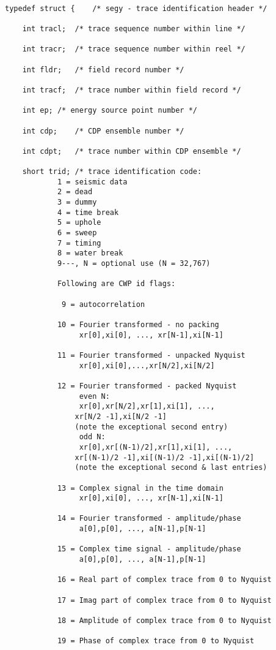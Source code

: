 
{ \small \begin{verbatim}

typedef struct {	/* segy - trace identification header */

	int tracl;	/* trace sequence number within line */

	int tracr;	/* trace sequence number within reel */

	int fldr;	/* field record number */

	int tracf;	/* trace number within field record */

	int ep;	/* energy source point number */

	int cdp;	/* CDP ensemble number */

	int cdpt;	/* trace number within CDP ensemble */

	short trid;	/* trace identification code:
			1 = seismic data
			2 = dead
			3 = dummy
			4 = time break
			5 = uphole
			6 = sweep
			7 = timing
			8 = water break
			9---, N = optional use (N = 32,767)

			Following are CWP id flags:

			 9 = autocorrelation

			10 = Fourier transformed - no packing
			     xr[0],xi[0], ..., xr[N-1],xi[N-1]

			11 = Fourier transformed - unpacked Nyquist
			     xr[0],xi[0],...,xr[N/2],xi[N/2]

			12 = Fourier transformed - packed Nyquist
	 		     even N:
			     xr[0],xr[N/2],xr[1],xi[1], ...,
				xr[N/2 -1],xi[N/2 -1]
				(note the exceptional second entry)
			     odd N:
			     xr[0],xr[(N-1)/2],xr[1],xi[1], ...,
				xr[(N-1)/2 -1],xi[(N-1)/2 -1],xi[(N-1)/2]
				(note the exceptional second & last entries)

			13 = Complex signal in the time domain
			     xr[0],xi[0], ..., xr[N-1],xi[N-1]

			14 = Fourier transformed - amplitude/phase
			     a[0],p[0], ..., a[N-1],p[N-1]

			15 = Complex time signal - amplitude/phase
			     a[0],p[0], ..., a[N-1],p[N-1]

			16 = Real part of complex trace from 0 to Nyquist

			17 = Imag part of complex trace from 0 to Nyquist

			18 = Amplitude of complex trace from 0 to Nyquist

			19 = Phase of complex trace from 0 to Nyquist


\end{verbatim}}
